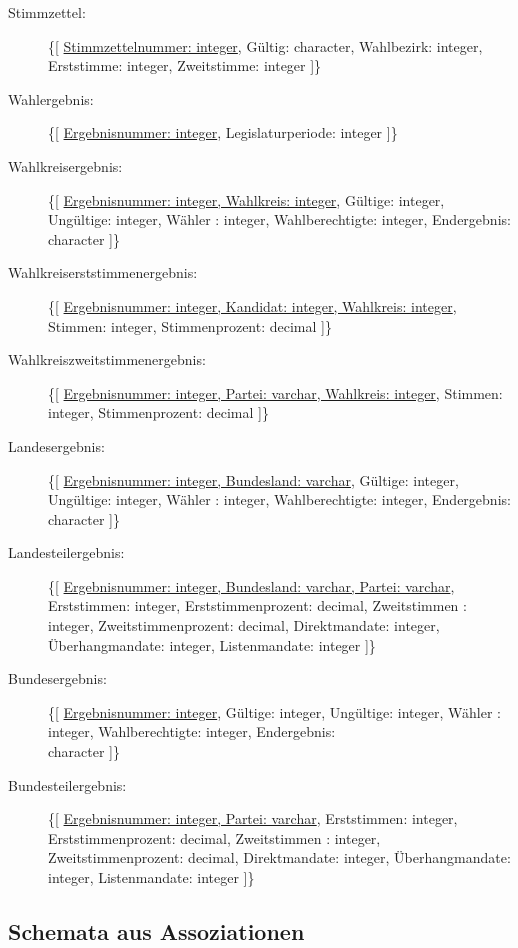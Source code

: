 \documentclass[a4paper]{article}
\begin{document}
\begin{description}
\item[Stimmzettel:] \{[ \underline{Stimmzettelnummer: integer}, Gültig: character, Wahlbezirk: integer, Erststimme: integer, Zweitstimme: integer ]\}

\item[Wahlergebnis:] \{[ \underline{Ergebnisnummer: integer}, Legislaturperiode: integer ]\}

\item[Wahlkreisergebnis:] \{[ \underline{Ergebnisnummer: integer, Wahlkreis: integer}, Gültige: integer, Ungültige: integer, Wähler : integer, Wahlberechtigte: integer, Endergebnis: character ]\}

\item[Wahlkreiserststimmenergebnis:] \{[ \underline{Ergebnisnummer: integer, Kandidat: integer, Wahlkreis: integer}, Stimmen: integer, Stimmenprozent: decimal ]\}

\item[Wahlkreiszweitstimmenergebnis:] \{[ \underline{Ergebnisnummer: integer, Partei: varchar, Wahlkreis: integer}, Stimmen: integer, Stimmenprozent: decimal ]\}

\item[Landesergebnis:] \{[ \underline{Ergebnisnummer: integer, Bundesland: varchar}, Gültige: integer, Ungültige: integer, Wähler : integer, Wahlberechtigte: integer, Endergebnis: character ]\}

\item[Landesteilergebnis:] \{[ \underline{Ergebnisnummer: integer, Bundesland: varchar, Partei: varchar}, Erststimmen: integer, Erststimmenprozent: decimal, Zweitstimmen : integer, Zweitstimmenprozent: decimal, Direktmandate: integer, Überhangmandate: integer, Listenmandate: integer ]\}

\item[Bundesergebnis:] \{[ \underline{Ergebnisnummer: integer}, Gültige: integer, Ungültige: integer, Wähler : integer, Wahlberechtigte: integer, Endergebnis: \\character ]\}

\item[Bundesteilergebnis:] \{[ \underline{Ergebnisnummer: integer, Partei: varchar}, Erststimmen: integer, Erststimmenprozent: decimal, Zweitstimmen : integer, Zweitstimmenprozent: decimal, Direktmandate: integer, Überhangmandate: integer, Listenmandate: integer ]\}

\end{description}

\subsection{Schemata aus Assoziationen}
\end{document}
